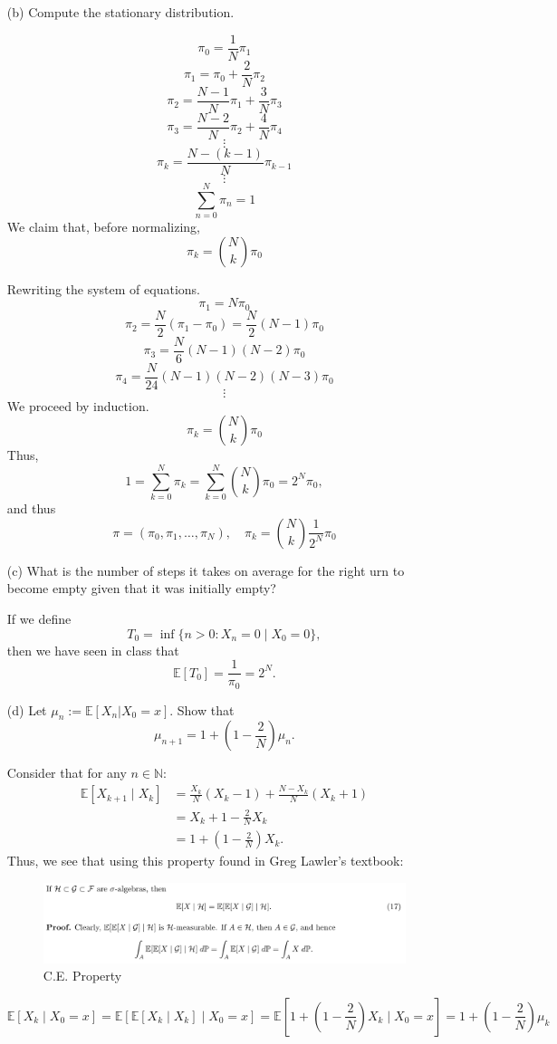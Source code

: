 \documentclass[11pt]{article}
\newcommand{\bbE}{\mathbb{E}}
\newcommand{\bbN}{\mathbb{N}}
\begin{document}
\begin{enumerate}
\begin{solution}
\end{solution}
    \item[(b)] Compute the stationary distribution.
\begin{solution}
\[\pi_0 = \frac{1}{N}\pi_1\]
\[\pi_1= \pi_0 + \frac{2}{N}\pi_2\]
\[\pi_2 = \frac{N-1}{N}\pi_1 + \frac{3}{N}\pi_3\]
\[\pi_3 = \frac{N-2}{N}\pi_2 + \frac{4}{N}\pi_4\]
\[\vdots\]
\[\pi_k = \frac{N-(k-1)}{N}\pi_{k-1}\]
\[\vdots\]
\[\sum_{n=0}^N \pi_n = 1\]
We claim that, before normalizing, 
\[\pi_k = \binom{N}{k}\pi_0\]

Rewriting the system of equations.
\[\pi_1 = N\pi_0\]
\[\pi_2 = \frac{N}{2}(\pi_1- \pi_0) = \frac{N}{2}(N-1)\pi_0\]
\[\pi_3 = \frac{N}{6}(N-1)(N-2)\pi_0\]
\[\pi_4 = \frac{N}{24}(N-1)(N-2)(N-3)\pi_0\]
\[\vdots\]
We proceed by induction.
\[\pi_k = \binom{N}{k}\pi_0\]
Thus,
\[1 = \sum_{k=0}^N \pi_k = \sum_{k=0}^N \binom{N}{k}\pi_0 = 2^N\pi_0,\] and thus 
\[\pi = (\pi_0, \pi_1, \dots, \pi_N), \quad \pi_k = \binom{N}{k} \frac{1}{2^N}\pi_0\]

\end{solution}
    \item[(c)] What is the number of steps it takes on average for the right urn to become empty given that it was initially empty?
\begin{solution}
    If we define 
    \[T_0 = \inf \{n >0 : X_n = 0 \mid X_0 = 0\},\] then we have seen in class that
    \[\bbE[T_0] = \frac{1}{\pi_0} = 2^N.\]
\end{solution}
    \item[(d)] Let \( \mu_n := \mathbb{E}[X_n | X_0 = x] \). Show that
    \[
    \mu_{n+1} = 1 + \left( 1 - \frac{2}{N} \right) \mu_n.
    \]
    \begin{solution}

Consider that for any $n \in \bbN:$
\begin{align*}
    \bbE[X_{k + 1}\mid X_k] &= \frac{X_k}{N}(X_k -1)+ \frac{N-X_k}{N}(X_k + 1)\\
    &= X_k + 1 - \frac{2}{N}X_k\\
    &= 1 + (1 - \frac{2}{N})X_k.
\end{align*}
Thus, we see that using this property found in Greg Lawler's textbook: 
\begin{figure}[H]
    \centering
    \includegraphics[width=0.5\linewidth]{Images/conditional expectation.png}
    \caption{C.E. Property}
\end{figure}
\[\bbE[X_k \mid X_0 = x] = \bbE[\bbE[X_k \mid X_k] \mid X_0 = x] = \bbE\left[1 + (1 - \frac{2}{N})X_k \mid X_0 = x\right] = 1 + (1-\frac{2}{N})\mu_k\]


\end{solution}
\end{enumerate}
\end{document}
